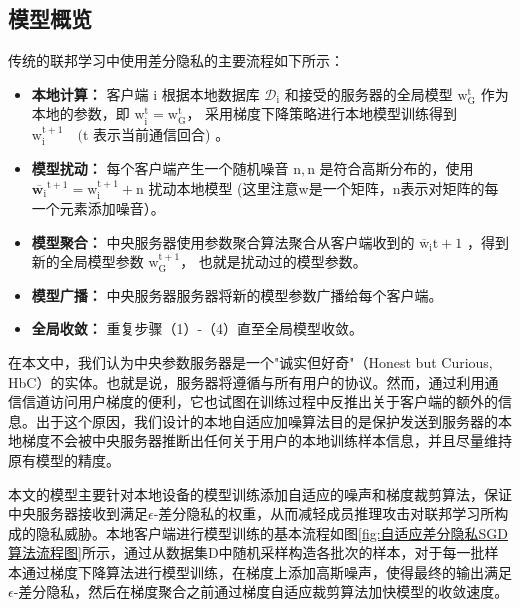 \subsection{模型概览}
传统的联邦学习中使用差分隐私的主要流程如下所示：
\begin{itemize}
\item \textbf{本地计算：}
客户端 $\mathrm{i}$ 根据本地数据库 $\mathcal{D}_{\mathrm{i}}$ 和接受的服务器的全局模型 $\mathrm{w}_{\mathrm{G}}^{\mathrm{t}}$ 作为本地的参数，即 $\mathrm{w}_{\mathrm{i}}^{\mathrm{t}}=\mathrm{w}_{\mathrm{G}}^{\mathrm{t}}$， 采用梯度下降策略进行本地模型训练得到 $\mathrm{w}_{\mathrm{i}}^{\mathrm{t}+1} \quad(\mathrm{t}$ 表示当前通信回合) 。

\item \textbf{模型扰动：}
每个客户端产生一个随机噪音 $\mathrm{n},\mathrm{n}$ 是符合高斯分布的，使用 $\overline{\mathbf{w}_{\mathrm{i}}}^{\mathrm{t}+1}=\mathrm{w}_{\mathrm{i}}^{\mathrm{t}+1}+\mathrm{n}$ 扰动本地模型 (这里注意w是一个矩阵，n表示对矩阵的每一个元素添加噪音）。

\item \textbf{模型聚合：}
中央服务器使用参数聚合算法聚合从客户端收到的 $\overline{\mathrm{w}}_{\mathrm{i}} \mathrm{t}+1$ ，得到新的全局模型参数 $\mathrm{w}_{\mathrm{G}}^{\mathrm{t}+1}$， 也就是扰动过的模型参数。

\item \textbf{模型广播：}
中央服务器服务器将新的模型参数广播给每个客户端。

\item \textbf{全局收敛：}
重复步骤（1）-（4）直至全局模型收敛。
\end{itemize}

在本文中，我们认为中央参数服务器是一个"诚实但好奇"（Honest but Curious, HbC）的实体。也就是说，服务器将遵循与所有用户的协议。然而，通过利用通信信道访问用户梯度的便利，它也试图在训练过程中反推出关于客户端的额外的信息。出于这个原因，我们设计的本地自适应加噪算法目的是保护发送到服务器的本地梯度不会被中央服务器推断出任何关于用户的本地训练样本信息，并且尽量维持原有模型的精度。

本文的模型主要针对本地设备的模型训练添加自适应的噪声和梯度裁剪算法，保证中央服务器接收到满足$\epsilon$-差分隐私的权重，从而减轻成员推理攻击对联邦学习所构成的隐私威胁。本地客户端进行模型训练的基本流程如图\ref{fig:自适应差分隐私SGD算法流程图}所示，通过从数据集D中随机采样构造各批次的样本，对于每一批样本通过梯度下降算法进行模型训练，在梯度上添加高斯噪声，使得最终的输出满足$\epsilon$-差分隐私，然后在梯度聚合之前通过梯度自适应裁剪算法加快模型的收敛速度。

